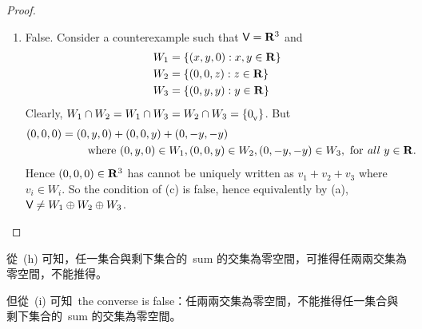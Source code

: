 \begin{proof}
\begin{enumerate}
\item False.
Consider a counterexample such that \(\textsf{V} = \mathbf{R}^3\) and
\begin{align*}
    W_1 & = \{ (x, y, 0) : x, y \in \mathbf{R} \} \\
    W_2 & = \{ (0, 0, z) : z \in \mathbf{R} \} \\
    W_3 & = \{ (0, y, y) : y \in \mathbf{R} \}
\end{align*}
Clearly, \(W_1 \cap W_2 = W_1 \cap W_3 = W_2 \cap W_3 = \{ 0_{_{\textsf{V}}} \}\).
But
\begin{align*}
    (0, 0, 0) & = (0, y, 0) + (0, 0, y) + (0, -y, -y) \\
    & \quad \quad \text{ where } (0, y, 0) \in W_1, (0, 0, y) \in W_2, (0, -y, -y) \in W_3, \text{ for \emph{all} } y \in \mathbf{R}.
\end{align*}
Hence \((0, 0, 0) \in \mathbf{R}^3\) has cannot be uniquely written as \(v_1 + v_2 + v_3\) where \(v_i \in W_i\).
So the condition of (c) is false, hence equivalently by (a), \(\textsf{V} \ne W_1 \oplus W_2 \oplus W_3\).
\end{enumerate}
\end{proof}

\begin{note}
從\ (h) 可知，任一集合與剩下集合的\ sum 的交集為零空間，可推得任兩兩交集為零空間，不能推得。

但從\ (i) 可知\ the converse is false：任兩兩交集為零空間，不能推得任一集合與剩下集合的\ sum 的交集為零空間。
\end{note}

